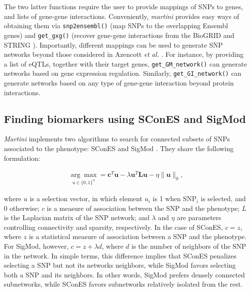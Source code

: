 \documentclass[a4paper]{article}
\begin{document}
    The two latter functions require the user to provide mappings of SNPs to genes, and lists of gene-gene interactions. Conveniently, \emph{martini} provides easy ways of obtaining them via \texttt{snp2ensembl()} (map SNPs to the overlapping Ensembl genes) and \texttt{get\_gxg()} (recover gene-gene interactions from the BioGRID \cite{oughtredBioGRIDDatabaseComprehensive2020} and STRING \cite{szklarczykSTRINGV11Protein2019}). Importantly, different mappings can be used to generate SNP networks beyond those considered in Azencott \emph{et al.} \cite{azencottEfficientNetworkguidedMultilocus2013}. For instance, by providing a list of eQTLs, together with their target genes, \texttt{get\_GM\_network()} can generate networks based on gene expression regulation. Similarly, \texttt{get\_GI\_network()} can generate networks based on any type of gene-gene interaction beyond protein interactions.
    
    \subsection{Finding biomarkers using SConES and SigMod}

    \emph{Martini} implements two algorithms to search for connected subsets of SNPs associated to the phenotype: SConES \cite{azencottEfficientNetworkguidedMultilocus2013} and SigMod \cite{liuSigModExactEfficient2017}. They share the following formulation:

    \begin{eqnarray}
        \label{eq:scones}
        \underset{u \in\{0,1\}^{n}}{\arg \max } = \boldsymbol{c}^{T} \boldsymbol{u} - \lambda \boldsymbol{u}^{T} \boldsymbol{L} \boldsymbol{u} - \eta\|\boldsymbol{u}\|_{0},
    \end{eqnarray}
    
    where $u$ is a selection vector, in which element $u_i$ is 1 when SNP$_i$ is selected, and 0 otherwise; $c$ is a measure of association between the SNP and the phenotype; $L$ is the Laplacian matrix of the SNP network; and $\lambda$ and $\eta$ are parameters controlling connectivity and sparsity, respectively. In the case of SConES, $c = z$, where $z$ is a statistical measure of association between a SNP and the phenotype. For SigMod, however, $c = z + \lambda d$, where $d$ is the number of neighbors of the SNP in the network. In simple terms, this difference implies that SConES penalizes selecting a SNP but not its networks neighbors, while SigMod favors selecting both a SNP and its neighbors. In other words, SigMod prefers densely connected subnetworks, while SConES favors subnetworks relatively isolated from the rest. 
    
\end{document}
